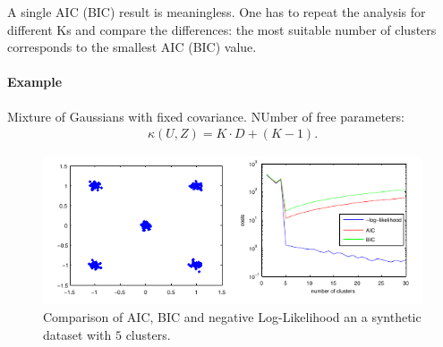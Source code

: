 A single AIC (BIC) result is meaningless. One has to repeat the analysis for different Ks and compare the differences: the most suitable number of clusters corresponds to the smallest AIC (BIC) value.

\paragraph{Example} Mixture of Gaussians with fixed covariance. NUmber of free parameters:
\begin{align*}
    \kappa(U,Z) = K\cdot D+(K-1).
\end{align*}

\begin{figure}[H]
    \centering
    \includegraphics[width=\textwidth]{img/kmeans_cluster_comparison}
    \caption{Comparison of AIC, BIC and negative Log-Likelihood an a synthetic dataset with $5$ clusters.}
\end{figure}

